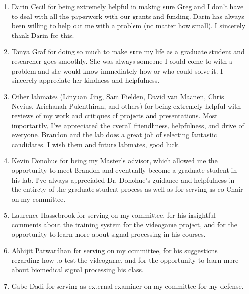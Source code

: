 \begin{enumerate}
	\item Darin Cecil for being extremely helpful in making sure Greg and I don't have to deal with all the paperwork with our grants and funding. Darin has always been willing to help out me with a problem (no matter how small). I sincerely thank Darin for this.
	\item Tanya Graf for doing so much to make sure my life as a graduate student and researcher goes smoothly. She was always someone I could come to with a problem and she would know immediately how or who could solve it. I sincerely appreciate her kindness and helpfulness.
	\item Other labmates (Linyuan Jing, Sam Fielden, David van Maanen, Chris Nevius, Arichanah Pulenthiran, and others) for being extremely helpful with reviews of my work and critiques of projects and presentations. Most importantly, I've appreciated the overall friendliness, helpfulness, and drive of everyone. Brandon and the lab does a great job of selecting fantastic candidates. I wish them and future labmates, good luck.
	\item Kevin Donohue for being my Master's advisor, which allowed me the opportunity to meet Brandon and eventually become a graduate student in his lab. I've always appreciated Dr. Donohue's guidance and helpfulness in the entirety of the graduate student process as well as for serving as co-Chair on my committee.
	\item Laurence Hassebrook for serving on my committee, for his insightful comments about the training system for the videogame project, and for the opportunity to learn more about signal processing in his courses.
	\item Abhijit Patwardhan for serving on my committee, for his suggestions regarding how to test the videogame, and for the opportunity to learn more about biomedical signal processing his class.
	\item Gabe Dadi for serving as external examiner on my committee for my defense.
\end{enumerate}
